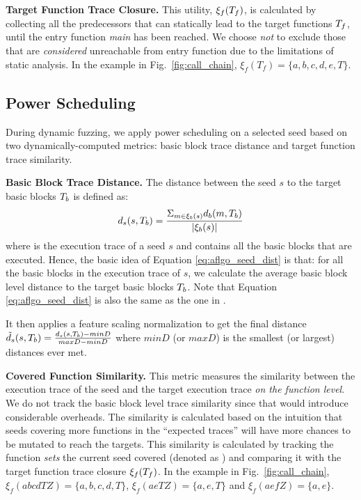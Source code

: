 \textbf{Target Function Trace Closure.} This utility, $\xi_f(T_f)$,  is calculated by collecting all the predecessors that can statically lead to the target functions $T_f$, until the entry function \emph{main} has been reached. We choose \emph{not} to exclude those that are \emph{considered} unreachable from entry function due to the limitations of static analysis. In the example in Fig.~\ref{fig:call_chain}, $\xi_f(T_f)=\{a,b,c,d,e,T\}$.




\subsection{Power Scheduling}  \label{subsec:powerSche}

During dynamic fuzzing, we apply power scheduling on a selected seed based on two dynamically-computed metrics: basic block trace distance and target function trace similarity.

\textbf{Basic Block Trace Distance.} The distance between the seed $s$ to the target basic blocks $T_b$ is defined as:
\begin{equation}
d_s(s,T_b) = \frac{\Sigma_{m\in\xi_b(s)}d_b(m, T_b)}{|\xi_b(s)|}
\label{eq:aflgo_seed_dist}
\end{equation}
where  is the execution trace of a seed $s$ and contains all the basic blocks that are executed. Hence, the basic idea of Equation  \ref{eq:aflgo_seed_dist} is that: for all the basic blocks in the  execution trace of $s$, we calculate the average basic block level distance to the target basic blocks  $T_b$.  Note that Equation \ref{eq:aflgo_seed_dist} is also the same as the one in \aflgo \cite{Bohme:2017:DGF}.

It then applies a feature scaling normalization to get the final distance $\tilde{d}_s(s,T_b)=\frac{d_s(s,T_b)-minD}{maxD-minD}$ where $minD$ (or $maxD$) is the smallest (or largest) distances ever met.


\textbf{Covered Function Similarity.} This metric measures the similarity between the execution trace of the seed and the target execution trace \emph{on the function level}. We do not track the basic block level trace similarity since that would introduce considerable overheads. The similarity is calculated based on the intuition that seeds covering more functions in the ``expected traces'' will have more chances to be mutated to reach the targets. This similarity is calculated by tracking the function \emph{sets} the current seed covered (denoted as ) and comparing it with the target function trace closure $\xi_f(T_f)$.  In the example in Fig.~\ref{fig:call_chain}, $\xi_f(abcdTZ)=\{a,b,c,d,T\}$, $\xi_f(aeTZ)=\{a,e,T\}$ and $\xi_f(aefZ)=\{a,e\}$.


